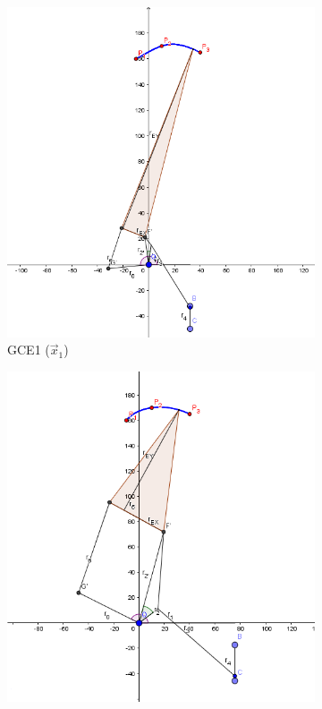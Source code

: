 

\begin{figure}
	\centering
	\begin{subfigure}[b]{0.45\linewidth}
		\includegraphics[width=\linewidth]{Figures/GCE1}
		\caption{GCE1 ($\vec{x}_1$)} \label{fig:G1} 
	\end{subfigure}
	\begin{subfigure}[b]{0.45\linewidth}
	\includegraphics[width=\linewidth]{Figures/GCE1_2}

\end{subfigure}
\end{figure}
